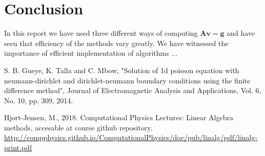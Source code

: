 \documentclass[american,a4paper,12pt]{article}
\renewcommand{\vec}[1]{\mathbf{#1}} %
\begin{document}
\section{Conclusion}
In this report we have used three different ways of computing $\vec{A}\vec{v} = \vec{g}$ and have seen that efficiency of the methods vary greatly. We have witnessed the importance of efficient implementation of algorithms ...


\begin{thebibliography}{9}
   S. B. Gueye, K. Talla and C. Mbow, "Solution of 1d poisson equation with neumann-dirichlet and dirichlet-neumann boundary conditions using the finite difference method", Journal of Electromagnetic Analysis and Applications, Vol. 6, No. 10, pp. 309, 2014.

   Hjort-Jensen, M., 2018. Computational Physics Lectures: Linear Algebra methods,  accesable at course github repository. \url{http://compphysics.github.io/ComputationalPhysics/doc/pub/linalg/pdf/linalg-print.pdf}







\end{thebibliography}
\end{document}
